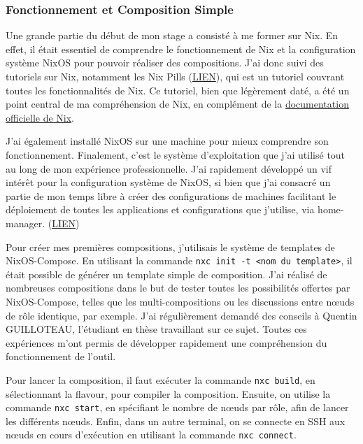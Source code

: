 \documentclass[a4paper,french,12pt, titlepage]{article}
\begin{document}
\hypertarget{fonctionnement-et-composition-simple}{%
\subsubsection{Fonctionnement et Composition
Simple}\label{fonctionnement-et-composition-simple}}

Une grande partie du début de mon stage a consisté à me former sur Nix.
En effet, il était essentiel de comprendre le fonctionnement de Nix et
la configuration système NixOS pour pouvoir réaliser des compositions.
J'ai donc suivi des tutoriels sur Nix, notamment les Nix Pills
(\href{https://nixos.org/guides/nix-pills/}{LIEN}), qui est un tutoriel
couvrant toutes les fonctionnalités de Nix. Ce tutoriel, bien que
légèrement daté, a été un point central de ma compréhension de Nix, en
complément de la
\href{https://nixos.org/manual/nix/stable/}{documentation officielle de
Nix}.\newline

J'ai également installé NixOS sur une machine pour mieux comprendre son
fonctionnement. Finalement, c'est le système d'exploitation que j'ai
utilisé tout au long de mon expérience professionnelle. J'ai rapidement
développé un vif intérêt pour la configuration système de NixOS, si bien
que j'ai consacré un partie de mon temps libre à créer des
configurations de machines facilitant le déploiement de toutes les
applications et configurations que j'utilise, via home-manager.
(\href{https://github.com/alexandreLITHAUD/my-nix-configuration}{LIEN})\newline

Pour créer mes premières compositions, j'utilisais le système de
templates de NixOS-Compose. En utilisant la commande
\texttt{nxc\ init\ -t\ \textless{}nom\ du\ template\textgreater{}}, il
était possible de générer un template simple de composition. J'ai
réalisé de nombreuses compositions dans le but de tester toutes les
possibilités offertes par NixOS-Compose, telles que les
multi-compositions ou les discussions entre nœuds de rôle identique, par
exemple. J'ai régulièrement demandé des conseils à Quentin GUILLOTEAU,
l'étudiant en thèse travaillant sur ce sujet. Toutes ces expériences
m'ont permis de développer rapidement une compréhension du
fonctionnement de l'outil.\newline

Pour lancer la composition, il faut exécuter la commande
\texttt{nxc\ build}, en sélectionnant la flavour, pour compiler la
composition. Ensuite, on utilise la commande \texttt{nxc\ start}, en
spécifiant le nombre de nœuds par rôle, afin de lancer les différents
nœuds. Enfin, dans un autre terminal, on se connecte en SSH aux nœuds en
cours d'exécution en utilisant la commande
\texttt{nxc\ connect}.\newline
\end{document}
